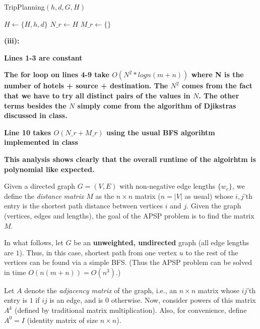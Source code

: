 \documentclass[addpoints]{exam}
\def\mysolution#1{}    %
\begin{document}
\begin{questions}
\begin{algorithm}
\caption{TripPlanning$(h,d,G,H)$}\label{alg:cap}
\begin{algorithmic}[1]
\State $H \gets \{H,h,d\}$ 
\State $N\_r \gets H$ 
\State $M\_r \gets \{\}$  
\EndIf
\EndFor \\
\end{algorithmic}
\end{algorithm}

\textbf{(iii): }

\textbf{Lines 1-3 are constant}

\textbf{The for loop on lines 4-9 take $O(N^2 * logn(m+n))$  where N is the number of hotels + source + destination. The $N^2$ comes from the fact that we have to try all distinct pairs of the values in $N$. The other terms besides the $N$ simply come from the algorithm of Djikstras discussed in class.}

\textbf{Line 10 takes $O(N\_r + M\_r)$ using the usual BFS algorihtm implemented in class}

\textbf{This analysis shows clearly that the overall runtime of the algoirhtm is polynomial like expected.}

\mysolution{

}

Given a directed graph $G = (V, E)$ with non-negative edge lengths $\{w_e\}$, we define the {\em distance matrix} $M$ as the $n \times n$ matrix ($n = |V|$ as usual) whose $i,j$'th entry is the shortest path distance between vertices $i$ and $j$. Given the graph (vertices, edges and lengths), the goal of the APSP problem is to find the matrix $M$.

In what follows, let $G$ be an {\bf unweighted, undirected} graph (all edge lengths are $1$). Thus, in this case, shortest path from one vertex $u$ to the rest of the vertices can be found via a simple BFS. (Thus the APSP problem can be solved in time $O(n(m+n)) = O(n^3)$.)

Let $A$ denote the {\em adjacency matrix} of the graph, i.e., an $n \times n$ matrix whose $ij$'th entry is $1$ if $ij$ is an edge, and is $0$ otherwise.  Now, consider powers of this matrix $A^k$ (defined by traditional matrix multiplication).  Also, for convenience, define $A^0 = I$ (identity matrix of size $n\times n$). 


\end{questions}
\end{document}
